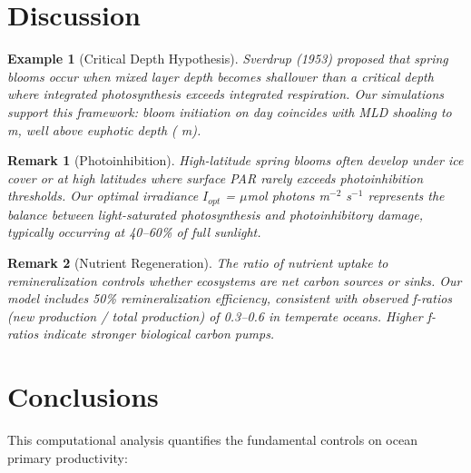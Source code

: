 \documentclass[a4paper, 11pt]{article}
\newtheorem{example}{Example}[section]
\newtheorem{remark}{Remark}[section]
\begin{document}
\section{Discussion}

\begin{example}[Critical Depth Hypothesis]
Sverdrup (1953) proposed that spring blooms occur when mixed layer depth becomes shallower
than a critical depth where integrated photosynthesis exceeds integrated respiration. Our
simulations support this framework: bloom initiation on day 
coincides with MLD shoaling to  m, well
above euphotic depth ( m).
\end{example}

\begin{remark}[Photoinhibition]
High-latitude spring blooms often develop under ice cover or at high latitudes where surface
PAR rarely exceeds photoinhibition thresholds. Our optimal irradiance $I_{opt}$ =
 $\mu$mol photons m$^{-2}$ s$^{-1}$ represents the balance between
light-saturated photosynthesis and photoinhibitory damage, typically occurring at 40--60\%
of full sunlight.
\end{remark}

\begin{remark}[Nutrient Regeneration]
The ratio of nutrient uptake to remineralization controls whether ecosystems are net carbon
sources or sinks. Our model includes 50\% remineralization efficiency, consistent with
observed f-ratios (new production / total production) of 0.3--0.6 in temperate oceans. Higher
f-ratios indicate stronger biological carbon pumps.
\end{remark}

\section{Conclusions}

This computational analysis quantifies the fundamental controls on ocean primary productivity:
\end{document}
